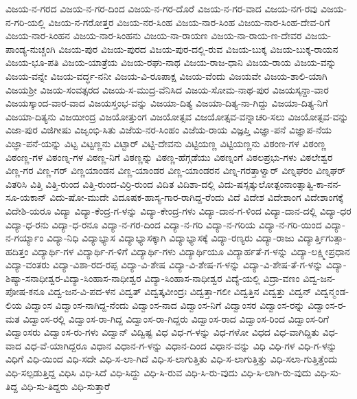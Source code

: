 ವಿಜಯ-ನ-ಗರದ
ವಿಜಯ-ನ-ಗರ-ದಿಂದ
ವಿಜಯ-ನ-ಗರ-ದೊರೆ
ವಿಜಯ-ನ-ಗರ-ವಾದ
ವಿಜಯ-ನಗ-ರವು
ವಿಜಯ-ನ-ಗರಿ-ಯಲ್ಲಿ
ವಿಜಯ-ನ-ಗರೋತ್ತರ
ವಿಜಯ-ನರ-ಸಿಂಹ
ವಿಜಯ-ನಾರ-ಸಿಂಹ
ವಿಜಯ-ನಾರ-ಸಿಂಹ-ದೇವ-ರಿಗೆ
ವಿಜಯ-ನಾರ-ಸಿಂಹನ
ವಿಜಯ-ನಾರ-ಸಿಂಹನು
ವಿಜಯ-ನಾ-ರಾಯಣ
ವಿಜಯ-ನಾ-ರಾಯ-ಣ-ದೇವರ
ವಿಜಯ-ಪಾಂಡ್ಯ-ನುಚ್ಚಂಗಿ
ವಿಜಯ-ಪುರ
ವಿಜಯ-ಪುರದ
ವಿಜಯ-ಪುರ-ದಲ್ಲಿ-ರುವ
ವಿಜಯ-ಬುಕ್ಕ
ವಿಜಯ-ಬುಕ್ಕ-ರಾಯನ
ವಿಜಯ-ಭೂ-ಪತಿ
ವಿಜಯ-ಯಾತ್ರೆಯ
ವಿಜಯ-ರಘು-ನಾಥ
ವಿಜಯ-ರಾಜ-ಧಾನಿ
ವಿಜಯ-ರಾಯ
ವಿಜಯ-ವನ್ನು
ವಿಜಯ-ವನ್ನೇ
ವಿಜಯ-ವರ್ದ್ಧ-ನನೀ
ವಿಜಯ-ವಿ-ರೂಪಾಕ್ಷ
ವಿಜಯ-ವೆಂದು
ವಿಜಯವೇ
ವಿಜಯ-ಶಾಲಿ-ಯಾಗಿ
ವಿಜಯಶ್ರೀ
ವಿಜಯ-ಸಂವತ್ಸರದ
ವಿಜಯ-ಸ-ಮುದ್ರ-ವೆನಿಸಿದ
ವಿಜಯ-ಸೋಮ-ನಾಥ-ಪುರ
ವಿಜಯಸ್ಕನ್ದಾ-ವಾರ
ವಿಜಯಸ್ಕಾಂದ-ವಾರ-ವಾದ
ವಿಜಯಸ್ತಂಭ-ವನ್ನು
ವಿಜಯಾ-ದಿತ್ಯ
ವಿಜಯಾ-ದಿತ್ಯ-ನಾ-ಗಿದ್ದು
ವಿಜಯಾ-ದಿತ್ಯ-ನಿಗೆ
ವಿಜಯಾ-ದಿತ್ಯನು
ವಿಜಯೀಂದ್ರ
ವಿಜಯೋತ್ತುಂಗ
ವಿಜಯೋತ್ಸವ
ವಿಜಯೋತ್ಸವ-ವನ್ನಾಚರಿ-ಸಲು
ವಿಜಯೋತ್ಸವ-ವನ್ನು
ವಿಜಾ-ಪುರ
ವಿಜಿಗೀಷು
ವಿಜೃಂಭಿ-ಸಿತು
ವಿಜೆಯ-ನರ-ಸಿಂಹಂ
ವಿಜೆಯ-ರಾಯ
ವಿಜ್ಞಪ್ತಿ
ವಿಜ್ಞಾ-ಪನೆ
ವಿಜ್ಞಾಪ-ನೆಯ
ವಿಜ್ಞಾ-ಪನೆ-ಯನ್ನು
ವಿಟ್ಟ
ವಿಟ್ಟಣ್ಣನು
ವಿಟ್ಟಾರ್
ವಿಟ್ಟಿ-ದೇವನು
ವಿಟ್ಟಿಯಣ್ಣ
ವಿಟ್ಟಿಯಣ್ಣನು
ವಿಠಂಣ-ಗಳ
ವಿಠಂಣ್ಣ
ವಿಠಂಣ್ಣ-ಗಳ
ವಿಠಂಣ್ನ-ಗಳ
ವಿಠಣ್ಣ-ನಿಗೆ
ವಿಠಣ್ಣನ್ನು
ವಿಠಣ್ಣ-ಹೆಗ್ಗಡೆಯು
ವಿಠಣ್ನಂಗೆ
ವಿಠಲಪ್ರಭು-ಗಳು
ವಿಠಲೇಶ್ವರ
ವಿಣ್ಣ-ಗರ
ವಿಣ್ಣ-ಗರ್
ವಿಣ್ಣಯಾಂಡನ
ವಿಣ್ಣ-ಯಾಂಡರ
ವಿಣ್ಣ-ಯಾಂಡರನ
ವಿಣ್ನ-ಗರತ್ತಾಳ್ವಾರ್
ವಿಣ್ನಘರಂ
ವಿಣ್ನಘರ್
ವಿತರಿಸಿ
ವಿತ್ತಿ
ವಿತ್ತಿ-ರುಂದ
ವಿತ್ತಿ-ರುಂದ-ವಿರ್ರಿ-ರುಂದ
ವಿದಿತ
ವಿದಿಶಾ-ದಲ್ಲಿ
ವಿದು-ಷಸ್ಸತ್ಕುಲೋತ್ಪಂನಾಂತ್ಸಾತ್ವಿ-ಕಾ-ನನ-ಸೂ-ಯಕಾನ್
ವಿದು-ಷೋ-ಮುದೇ
ವಿದೂಷಕ-ಹಾಸ್ಯ-ಗಾರ-ರಾಗಿದ್ದ-ರೆಂದು
ವಿದೆ
ವಿದೇಶ
ವಿದೇಶಾಂಗ
ವಿದೇಶಾಂಗಕ್ಕೆ
ವಿದೇಶಿ-ಯರೂ
ವಿದ್ಯಾ
ವಿದ್ಯಾ-ಕೆಂದ್ರ-ಗ-ಳನ್ನು
ವಿದ್ಯಾ-ಕೇಂದ್ರ-ಗಳು
ವಿದ್ಯಾ-ದಾನ-ಗ-ಳಿಂದ
ವಿದ್ಯಾ-ದಾನ-ದಲ್ಲಿ
ವಿದ್ಯಾ-ಧರ
ವಿದ್ಯಾ-ಧ-ರನು
ವಿದ್ಯಾ-ಧ-ರನೂ
ವಿದ್ಯಾ-ನ-ಗರ-ದಿಂದ
ವಿದ್ಯಾ-ನ-ಗರಿ
ವಿದ್ಯಾ-ನ-ಗರಿಯ
ವಿದ್ಯಾ-ನ-ಗರಿ-ಯಿಂದ
ವಿದ್ಯಾ-ನ-ಗರ್ಯ್ಯಾಂ
ವಿದ್ಯಾ-ನಿಧಿ
ವಿದ್ಯಾಭ್ಯಾಸ
ವಿದ್ಯಾಭ್ಯಾಸಕ್ಕಾಗಿ
ವಿದ್ಯಾಭ್ಯಾಸಕ್ಕೆ
ವಿದ್ಯಾ-ರಣ್ಯರು
ವಿದ್ಯಾ-ರಾಜು
ವಿದ್ಯಾರ್ತ್ತಿಗುತ್ಸಾ-ಹದಿತ್ತಂ
ವಿದ್ಯಾರ್ಥಿ-ಗಳ
ವಿದ್ಯಾರ್ಥಿ-ಗ-ಳಿಗೆ
ವಿದ್ಯಾರ್ಥಿ-ಗಳು
ವಿದ್ಯಾರ್ಥಿಯೂ
ವಿದ್ಯಾರ್ಹತೆ-ಗ-ಳನ್ನು
ವಿದ್ಯಾ-ಲಕ್ಷ್ಮೀಪ್ರಧಾನ
ವಿದ್ಯಾ-ವಂತರು
ವಿದ್ಯಾ-ವಿಶಾ-ರದ-ರಪ್ಪ
ವಿದ್ಯಾ-ವಿ-ಶೇಷ
ವಿದ್ಯಾ-ವಿ-ಶೇಷ-ಗ-ಳನ್ನು
ವಿದ್ಯಾ-ವಿ-ಶೇಷ-ತೆ-ಗ-ಳನ್ನು
ವಿದ್ಯಾ-ಶಿಷ್ಯಾ-ಸನಾಧೀಶ್ವರ-ವಿದ್ಯಾ-ಸಿಂಹಾಸ-ನಾಧೀಶ್ವರ
ವಿದ್ಯಾ-ಸಿಂಹಾಸ-ನಾಧೀಶ್ವರ
ವಿದ್ಯೆ-ಯಲ್ಲಿ
ವಿದ್ರಾ-ವಣಂ
ವಿದ್ವ-ಜನ-ಪೋಷ-ಕನೂ
ವಿದ್ವ-ಜನ-ವಿ-ಪದ-ಳನ
ವಿದ್ವತ್
ವಿದ್ವತ್ಕವೀಂದ್ರಃ
ವಿದ್ವತ್ತಾ-ಗಲೀ
ವಿದ್ವತ್ತಿನ
ವಿದ್ವತ್ತು
ವಿದ್ವನ್
ವಿದ್ವನ್ಮಂಡ-ಲಿಯ
ವಿದ್ವಾಂಸ
ವಿದ್ವಾಂಸ-ನಾಗಿದ್ದ-ನೆಂದು
ವಿದ್ವಾಂಸ-ನಾದ
ವಿದ್ವಾಂಸ-ನಿಗೆ
ವಿದ್ವಾಂಸರ
ವಿದ್ವಾಂಸ-ರನ್ನು
ವಿದ್ವಾಂಸ-ರ-ಮತ
ವಿದ್ವಾಂಸ-ರಲ್ಲಿ
ವಿದ್ವಾಂಸ-ರಾ-ಗಿದ್ದ
ವಿದ್ವಾಂಸ-ರಾ-ಗಿದ್ದರು
ವಿದ್ವಾಂಸ-ರಾದ
ವಿದ್ವಾಂಸ-ರಿಂದ
ವಿದ್ವಾಂಸ-ರಿಗೆ
ವಿದ್ವಾಂಸರು
ವಿದ್ವಾಂಸ-ರು-ಗಳು
ವಿದ್ವಾನ್
ವಿದ್ವಿಷ್ಟ
ವಿಧ
ವಿಧ-ಗ-ಳನ್ನು
ವಿಧ-ಗಳೋ
ವಿಧದ
ವಿಧ-ವಾಗಿದ್ದಿತು
ವಿಧ-ವಾದ
ವಿಧ-ವೆ-ಯಾಗಿದ್ದರೂ
ವಿಧಾನ
ವಿಧಾನ-ಗ-ಳನ್ನು
ವಿಧಾನ-ದಿಂದ
ವಿಧಾನ-ವನ್ನು
ವಿಧಿ
ವಿಧಿ-ಗಳ
ವಿಧಿ-ಗ-ಳನ್ನು
ವಿಧಿಗೆ
ವಿಧಿ-ಯಿಂದ
ವಿಧಿ-ಸದೇ
ವಿಧಿ-ಸ-ಲಾ-ಗಿದೆ
ವಿಧಿ-ಸ-ಲಾಗುತ್ತಿತು
ವಿಧಿ-ಸ-ಲಾಗುತ್ತಿತ್ತು
ವಿಧಿ-ಸಲಾ-ಗುತ್ತಿತ್ತೆಂದು
ವಿಧಿ-ಸಲ್ಪಡುತ್ತಿದ್ದ
ವಿಧಿಸಿ
ವಿಧಿ-ಸಿದೆ
ವಿಧಿ-ಸಿದ್ದು
ವಿಧಿ-ಸಿ-ರುವ
ವಿಧಿ-ಸಿ-ರು-ವುದು
ವಿಧಿ-ಸಿ-ಲಾಗಿ-ರು-ವುದು
ವಿಧಿ-ಸು-ತಿದ್ದ
ವಿಧಿ-ಸು-ತಿದ್ದರು
ವಿಧಿ-ಸುತ್ತಾರೆ

